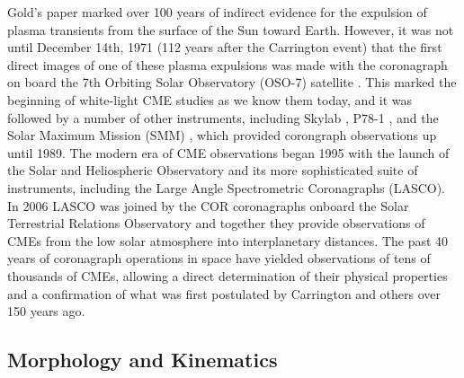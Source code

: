 Gold's paper marked over 100 years of indirect evidence for the expulsion of plasma transients from the surface of the Sun toward Earth. However, it was not until December 14th, 1971 (112 years after the Carrington event) that the first direct images of one of these plasma expulsions was made with the coronagraph on board the 7th Orbiting Solar Observatory (OSO-7) satellite \citep{tousey1971}. This marked the beginning of white-light CME studies as we know them today, and it was followed by a number of other instruments, including Skylab \citep{macqueen1980}, P78-1 \citep{sheeley1980}, and the Solar Maximum Mission (SMM) \citep{hundhausen1999}, which provided corongraph observations up until 1989. The modern era of CME observations began 1995 with the launch of the Solar and Heliospheric Observatory \citep[\emph{SOHO};][]{dom95} and its more sophisticated suite of instruments, including the Large Angle Spectrometric Coronagraphs (LASCO). In 2006 LASCO was joined by the COR coronagraphs onboard the Solar Terrestrial Relations Observatory \citep[\emph{STEREO};][]{kai08} and together they provide observations of CMEs from the low solar atmosphere into interplanetary distances. The past 40 years of coronagraph operations in space have yielded observations of tens of thousands of CMEs, allowing a direct determination of their physical properties and a confirmation of what was first postulated by Carrington and others over 150 years ago.

\subsection{Morphology and Kinematics} 


